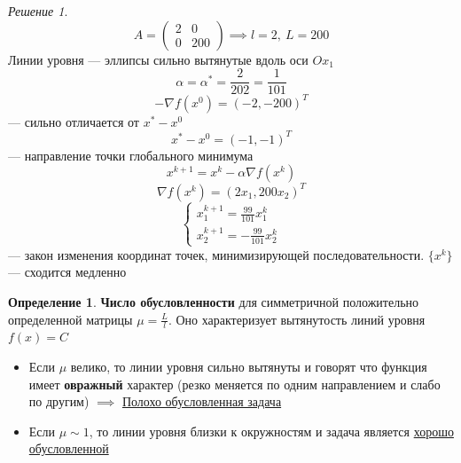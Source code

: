 \documentclass[oneside]{book}
\theoremstyle{plain}
\theoremstyle{remark}
\newtheorem*{solution}{Решение}
\theoremstyle{definition}
\newtheorem*{definition}{Определение}
\begin{document}
\begin{solution}
\[ A = \begin{pmatrix} 2 & 0 \\ 0 & 200 \end{pmatrix} \implies l = 2,\ L = 200\]
Линии уровня --- эллипсы сильно вытянутые вдоль оси \(Ox_1\)
\[ \alpha = \alpha^* = \frac{2}{202} = \frac{1}{101} \]
\[ -\nabla f(x^0) = (-2, -200)^T \]
--- сильно отличается от \(x^* - x^0\)
\[ x^* - x^0 = (-1, -1)^T \]
--- направление точки глобального минимума
\[ x^{k + 1} = x^k - \alpha \nabla f(x^k) \]
\[ \nabla f(x^k) = (2x_1, 200x_2)^T \]
\[ \begin{cases}
x_1^{k + 1} = \frac{99}{101} x_1^k \\
x_2^{k + 1} = - \frac{99}{101} x_2^k
\end{cases}\]
--- закон изменения координат точек, минимизирующей последовательности. \(\{x^k\}\) --- сходится медленно
\end{solution}
\begin{definition}
\textbf{Число обусловленности} для симметричной положительно определенной матрицы \(\mu = \frac{L}{l}\). Оно характеризует вытянутость линий уровня \(f(x) = C\)
\begin{itemize}
\item Если \(\mu\) велико, то линии уровня сильно вытянуты и говорят что функция имеет \textbf{овражный} характер (резко меняется по одним направлением и слабо по другим) \(\implies\) \uline{Полохо обусловленная задача}
\item Если \(\mu \sim 1\), то линии уровня близки к окружностям и задача является \uline{хорошо обусловленной}
\end{itemize}
\end{definition}
\end{document}
